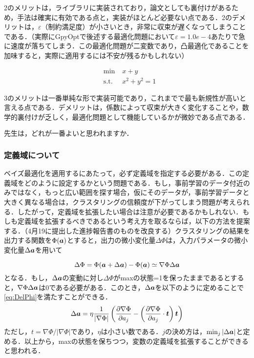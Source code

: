 \documentclass[11pt]{jsarticle}
\begin{document}
				2のメリットは，ライブラリに実装されており，論文としても裏付けがあるため，手法は確実に有効である点と，実装がほとんど必要ない点である．2のデメリットは，$ \varepsilon $（制約満足度）が小さいとき，非常に収束が遅くなってしまうことである．（実際にGpyOptで後述する最適化問題において$ \varepsilon=1.0e-4 $あたりで急に速度が落ちてしまう．この最適化問題が二変数であり，凸最適化であることを加味すると，実際に適用するには不安が残るかもしれない）
				
				\begin{eqnarray}
					&\min& \; x+y \\
					&\mathrm{s.t.}& \; x^2 + y^2 =1
				\end{eqnarray}
				
				3のメリットは一番単純な形で実装可能であり，これまでで最も新規性が高いと言える点である．デメリットは，係数によって収束が大きく変化することや，数学的裏付けが乏しく，最適化問題として機能しているかが微妙である点である．
				
				先生は，どれが一番よいと思われますか．
			\subsubsection{定義域について}
				ベイズ最適化を適用するにあたって，必ず定義域を指定する必要がある．この定義域をどのように設定するかという問題である．もし，事前学習のデータ付近のみではなく，もっと広い範囲を探す場合，仮にそのデータが，事前学習データと大きく異なる場合は，クラスタリングの信頼度が下がってしまう問題が考えられる．したがって，定義域を拡張したい場合は注意が必要であるかもしれない．もしも定義域を拡張するべきであるという考え方を取るならば，以下の方法を提案する．（4月19に提出した進捗報告書のものを改良する）クラスタリングの結果を出力する関数を$ \Phi(\boldsymbol{a}) $とすると，出力の微小変化量$ \Delta \Phi $は，入力パラメータの微小変化量$ \Delta \boldsymbol{a} $を用いて
				
				\begin{equation}\label{eq:DelPhi}
					\Delta \Phi = \Phi(\boldsymbol{a}+\Delta \boldsymbol{a}) - \Phi(\boldsymbol{a}) \simeq \nabla \Phi \Delta \boldsymbol{a}
				\end{equation}
				となる．もし，$ \Delta \boldsymbol{a} $の変動に対し$ \Delta \Phi $がmaxの状態=1を保ったままであるとすると，$ \nabla \Phi \Delta \boldsymbol{a} $は0である必要がある．このとき，$ \Delta \boldsymbol{a} $を以下のように定めることで\eqref{eq:DelPhi}を満たすことができる．
				\begin{equation}\label{eq:}
					\Delta \boldsymbol{a} = \eta \frac{1}{|\nabla \Phi|} \left(\frac{\partial \nabla \Phi}{\partial a_j} -\left(\frac{\partial \nabla \Phi}{\partial a_j} \cdot \boldsymbol{t}\right)\boldsymbol{t} \right)
				\end{equation}
				ただし，$ t = \nabla \Phi / |\nabla \Phi| $であり，$ \eta $は小さい数である．$ j $の決め方は，$ \min_j |\Delta \boldsymbol{a}| $と定める．以上から，maxの状態を保ちつつ，変数の定義域を拡張することができると思われる．
\end{document}
